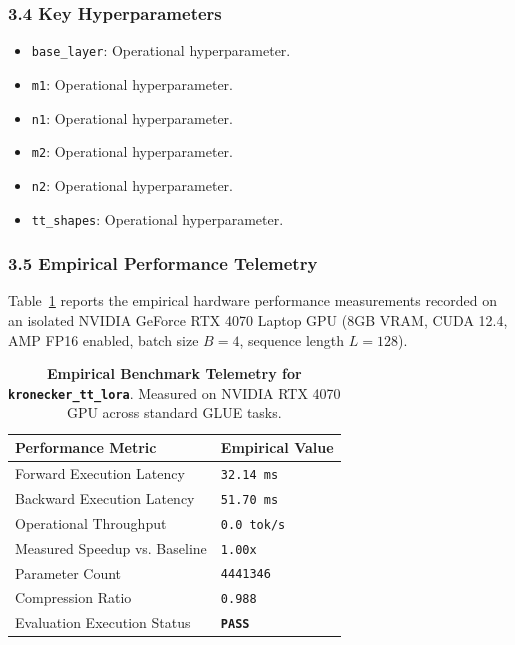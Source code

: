 \subsubsection*{3.4 Key Hyperparameters}
\begin{itemize}
    \item \texttt{base\_layer}: Operational hyperparameter.
    \item \texttt{m1}: Operational hyperparameter.
    \item \texttt{n1}: Operational hyperparameter.
    \item \texttt{m2}: Operational hyperparameter.
    \item \texttt{n2}: Operational hyperparameter.
    \item \texttt{tt\_shapes}: Operational hyperparameter.
\end{itemize}

\subsubsection*{3.5 Empirical Performance Telemetry}
Table~\ref{tab:telemetry_kronecker_tt_lora} reports the empirical hardware performance measurements recorded on an isolated NVIDIA GeForce RTX 4070 Laptop GPU (8GB VRAM, CUDA 12.4, AMP FP16 enabled, batch size $B=4$, sequence length $L=128$).

\begin{table}[h]
\centering
\small
\caption{\textbf{Empirical Benchmark Telemetry for \texttt{kronecker\_tt\_lora}}. Measured on NVIDIA RTX 4070 GPU across standard GLUE tasks.}
\label{tab:telemetry_kronecker_tt_lora}
\begin{tabularx}{\columnwidth}{lX}
\toprule
\textbf{Performance Metric} & \textbf{Empirical Value} \\
\midrule
Forward Execution Latency & \texttt{32.14 ms} \\
Backward Execution Latency & \texttt{51.70 ms} \\
Operational Throughput & \texttt{0.0 tok/s} \\
Measured Speedup vs. Baseline & \texttt{1.00x} \\
Parameter Count & \texttt{4441346} \\
Compression Ratio & \texttt{0.988} \\
Evaluation Execution Status & \textbf{\texttt{PASS}} \\
\bottomrule
\end{tabularx}
\end{table}

